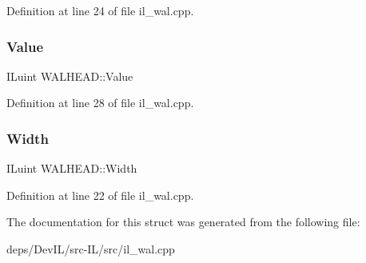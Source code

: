 Definition at line 24 of file il\+\_\+wal.\+cpp.

\mbox{\label{structWALHEAD_a6af1915a234d7fe69fd4c7489cd86969}} 
\subsubsection{\texorpdfstring{Value}{Value}}
{\footnotesize\ttfamily I\+Luint W\+A\+L\+H\+E\+A\+D\+::\+Value}



Definition at line 28 of file il\+\_\+wal.\+cpp.

\mbox{\label{structWALHEAD_a9471e8d9cd176b03ae64b21cb6a0aa65}} 
\subsubsection{\texorpdfstring{Width}{Width}}
{\footnotesize\ttfamily I\+Luint W\+A\+L\+H\+E\+A\+D\+::\+Width}



Definition at line 22 of file il\+\_\+wal.\+cpp.



The documentation for this struct was generated from the following file\+:\begin{DoxyCompactItemize}
\item 
deps/\+Dev\+I\+L/src-\/\+I\+L/src/il\+\_\+wal.\+cpp\end{DoxyCompactItemize}
